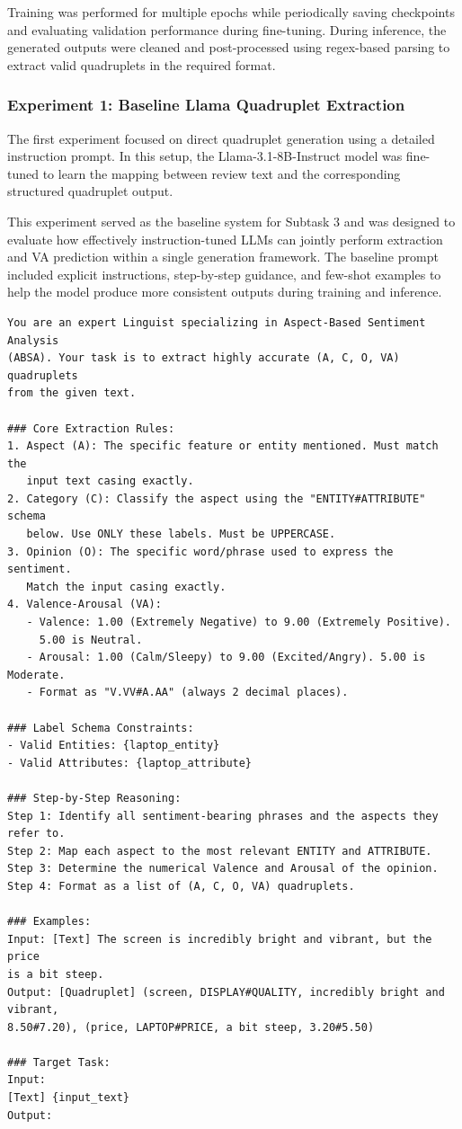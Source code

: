 \documentclass{article}
\begin{document}
Training was performed for multiple epochs while periodically saving checkpoints and evaluating validation performance during fine-tuning. During inference, the generated outputs were cleaned and post-processed using regex-based parsing to extract valid quadruplets in the required format.

\subsubsection{Experiment 1: Baseline Llama Quadruplet Extraction}

The first experiment focused on direct quadruplet generation using a detailed instruction prompt. In this setup, the Llama-3.1-8B-Instruct model was fine-tuned to learn the mapping between review text and the corresponding structured quadruplet output.

This experiment served as the baseline system for Subtask 3 and was designed to evaluate how effectively instruction-tuned LLMs can jointly perform extraction and VA prediction within a single generation framework. The baseline prompt included explicit instructions, step-by-step guidance, and few-shot examples to help the model produce more consistent outputs during training and inference.

\begin{verbatim}
You are an expert Linguist specializing in Aspect-Based Sentiment Analysis 
(ABSA). Your task is to extract highly accurate (A, C, O, VA) quadruplets 
from the given text.

### Core Extraction Rules:
1. Aspect (A): The specific feature or entity mentioned. Must match the 
   input text casing exactly.
2. Category (C): Classify the aspect using the "ENTITY#ATTRIBUTE" schema 
   below. Use ONLY these labels. Must be UPPERCASE.
3. Opinion (O): The specific word/phrase used to express the sentiment. 
   Match the input casing exactly.
4. Valence-Arousal (VA): 
   - Valence: 1.00 (Extremely Negative) to 9.00 (Extremely Positive). 
     5.00 is Neutral.
   - Arousal: 1.00 (Calm/Sleepy) to 9.00 (Excited/Angry). 5.00 is Moderate.
   - Format as "V.VV#A.AA" (always 2 decimal places).

### Label Schema Constraints:
- Valid Entities: {laptop_entity}
- Valid Attributes: {laptop_attribute}

### Step-by-Step Reasoning:
Step 1: Identify all sentiment-bearing phrases and the aspects they refer to.
Step 2: Map each aspect to the most relevant ENTITY and ATTRIBUTE.
Step 3: Determine the numerical Valence and Arousal of the opinion.
Step 4: Format as a list of (A, C, O, VA) quadruplets.

### Examples:
Input: [Text] The screen is incredibly bright and vibrant, but the price 
is a bit steep.
Output: [Quadruplet] (screen, DISPLAY#QUALITY, incredibly bright and vibrant, 
8.50#7.20), (price, LAPTOP#PRICE, a bit steep, 3.20#5.50)

### Target Task:
Input:
[Text] {input_text}
Output:
\end{verbatim}
\end{document}

